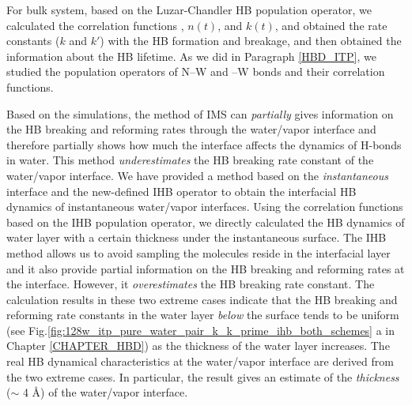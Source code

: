 For bulk system, based on the Luzar-Chandler HB population operator, 
we calculated the correlation functions \CHB, $n(t)$, and $k(t)$, and obtained the rate constants ($k$ and $k'$) with the HB formation and breakage, 
and then obtained the information about the HB lifetime. 
As we did in Paragraph \ref{HBD_ITP}, we studied the population operators of N--W 
and \I--W bonds and their correlation functions. 

Based on the simulations, the method of IMS can \emph{partially} gives information on the HB breaking and reforming
rates through the water/vapor interface and therefore partially shows how much the interface affects the dynamics of H-bonds in water. 
This method \emph{underestimates} the HB breaking rate constant of the water/vapor interface. 
We have provided a method based on the \emph{instantaneous} interface and the new-defined
IHB operator to obtain the interfacial HB dynamics of instantaneous water/vapor interfaces.  
Using the correlation functions based on the IHB population operator, we directly calculated the HB dynamics of water layer with a certain thickness 
under the instantaneous surface. 
The IHB method allows us to avoid sampling the molecules reside in the interfacial layer and
it also provide partial information on the HB breaking and reforming rates at the interface. 
However, it \emph{overestimates} the HB breaking rate constant. The calculation results in these two extreme cases
indicate that the HB breaking and reforming rate constants in the water layer \emph{below} the surface tends to be uniform 
(see Fig.\thinspace\ref{fig:128w_itp_pure_water_pair_k_k_prime_ihb_both_schemes} a in Chapter \ref{CHAPTER_HBD}) 
as the thickness of the water layer increases. The real HB dynamical characteristics at the water/vapor interface 
are derived from the two extreme cases. 
In particular, the result gives an estimate of the \emph{thickness} ($\sim$ 4 \AA) of the water/vapor interface.  

